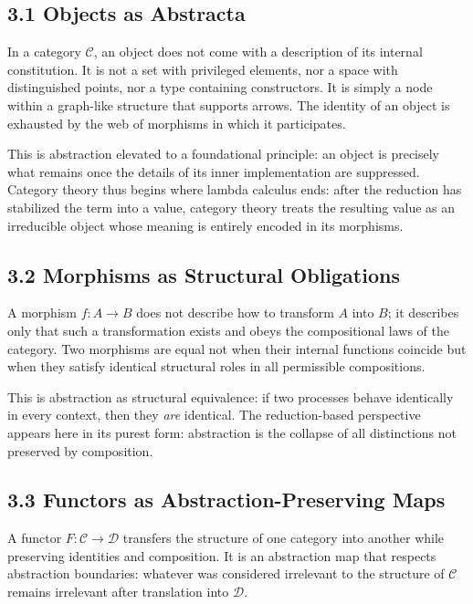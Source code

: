 \documentclass[11pt,letterpaper]{article}
\begin{document}
\subsection{3.1 Objects as Abstracta}

In a category \(\mathcal{C}\), an object does not come with a description of its internal constitution. It is not a set with privileged elements, nor a space with distinguished points, nor a type containing constructors. It is simply a node within a graph-like structure that supports arrows. The identity of an object is exhausted by the web of morphisms in which it participates.

This is abstraction elevated to a foundational principle: an object is precisely what remains once the details of its inner implementation are suppressed. Category theory thus begins where lambda calculus ends: after the reduction has stabilized the term into a value, category theory treats the resulting value as an irreducible object whose meaning is entirely encoded in its morphisms.

\subsection{3.2 Morphisms as Structural Obligations}

A morphism \(f : A \to B\) does not describe how to transform \(A\) into \(B\); it describes only that such a transformation exists and obeys the compositional laws of the category. Two morphisms are equal not when their internal functions coincide but when they satisfy identical structural roles in all permissible compositions.

This is abstraction as structural equivalence: if two processes behave identically in every context, then they \emph{are} identical. The reduction-based perspective appears here in its purest form: abstraction is the collapse of all distinctions not preserved by composition.

\subsection{3.3 Functors as Abstraction-Preserving Maps}

A functor \(F : \mathcal{C} \to \mathcal{D}\) transfers the structure of one category into another while preserving identities and composition. It is an abstraction map that respects abstraction boundaries: whatever was considered irrelevant to the structure of \(\mathcal{C}\) remains irrelevant after translation into \(\mathcal{D}\).
\end{document}
